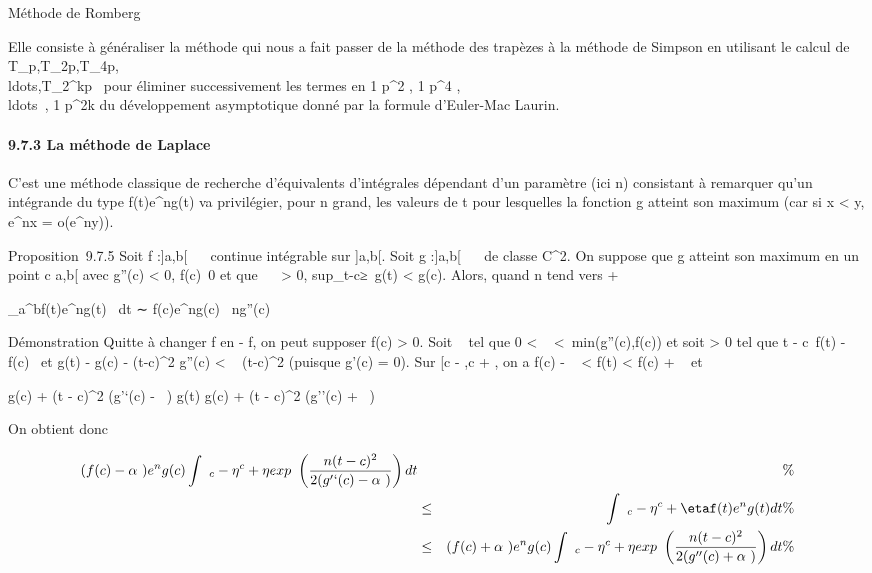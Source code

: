 \documentclass[]{article}
\begin{document}
Méthode de Romberg

Elle consiste à généraliser la méthode qui nous a fait passer de la
méthode des trapèzes à la méthode de Simpson en utilisant le calcul de
T_p,T_2p,T_4p,\\ldots,T_2^kp~
pour éliminer successivement les termes en  1 \over
p^2 , 1 \over p^4
,\\ldots~, 1
\over p^2k du développement asymptotique
donné par la formule d'Euler-Mac Laurin.

\paragraph{9.7.3 La méthode de Laplace}

C'est une méthode classique de recherche d'équivalents d'intégrales
dépendant d'un paramètre (ici n) consistant à remarquer qu'un intégrande
du type f(t)e^ng(t) va privilégier, pour n grand, les valeurs
de t pour lesquelles la fonction g atteint son maximum (car si x
\textless{} y, e^nx = o(e^ny)).

Proposition~9.7.5 Soit f :{]}a,b{[}\rightarrow~ ~ continue intégrable sur
{]}a,b{[}. Soit g :{]}a,b{[}\rightarrow~ ~ de classe C^2. On suppose que
g atteint son maximum en un point c \in{]}a,b{[} avec g''(c) \textless{}
0, f(c)\neq~0 et que \forall~~\eta
\textgreater{} 0,
sup_t-c≥\eta~g(t)
\textless{} g(c). Alors, quand n tend vers + \infty~

\int  _a^bf(t)e^ng(t)~
dt ∼ f(c)e^ng(c)\pi~
\over ng''(c) 

Démonstration Quitte à changer f en - f, on peut supposer f(c)
\textgreater{} 0. Soit \alpha~ tel que 0 \textless{} \alpha~
\textless{}\
min(g''(c),f(c)) et soit \eta \textgreater{} 0 tel
que t - c\leq \eta \rigtharrow~f(t) - f(c)\leq \alpha~ et
g(t) - g(c) - (t-c)^2 
g''(c) \textless{} \alpha~ (t-c)^2 \over
2 (puisque g'(c) = 0). Sur {[}c - \eta,c + \eta{]}, on a f(c) - \alpha~
\textless{} f(t) \textless{} f(c) + \alpha~ et

g(c) + (t - c)^2  (g'`(c) - \alpha~) \leq
g(t) \leq g(c) + (t - c)^2 \over 2 (g''(c) +
\alpha~)

On obtient donc

\begin{align*} (f(c) -
\alpha~)e^ng(c)\int ~
_c-\eta^c+\eta exp~
\left (n (t - c)^2 \over 2
(g'`(c) - \alpha~)\right ) dt&& \%&
\\ & \leq& \int ~
_c-\eta^c+\etaf(t)e^ng(t) dt \%&
\\ & \leq& (f(c) +
\alpha~)e^ng(c)\int ~
_c-\eta^c+\eta exp~
\left (n (t - c)^2 \over 2
(g''(c) + \alpha~)\right ) dt\%&
\\ \end{align*}
\end{document}
